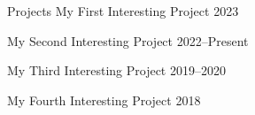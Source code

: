 \documentclass{src/cv}
\begin{document}
\setpersonalsummary{\lipsum[1][1-5]} %
\cvheader

\begin{skills} %
	\faitem{\faCode} \lipsum[4][1]
	\faitem{\faLinux} \lipsum[4][2]
	\faitem{\faDatabase} \lipsum[4][3]
	\faitem{\faChartBar} \lipsum[4][4]
	\columnbreak
	\faitem{\faGit*} \lipsum[4][5]
	\faitem{\faProjectDiagram} \lipsum[4][6]
	\faitem{\faCogs} \lipsum[4][7]
	\faitem{\faCloud} \lipsum[4][8]
\end{skills}


\begin{career}
    { %
    \begin{careersection}{Projects}
        \careeritem
	{My First Interesting Project} %
        {2023} %
        {} %
        { %
        \begin{careeritemdetails}
	\item \lipsum[5][1-2] 
	\item \lipsum[5][3-4]
	\item \lipsum[5][4-5]
        \end{careeritemdetails}
        }
        \careeritem
	{My Second Interesting Project} %
        {2022--Present} %
        {} %
        { %
        \begin{careeritemdetails}
	\item \lipsum[6][1-2] 
	\item \lipsum[6][3-4]
	\item \lipsum[6][5-6]
        \end{careeritemdetails}
        }
        \careeritem
	{My Third Interesting Project} %
        {2019--2020} %
        {} %
        { %
        \begin{careeritemdetails}
	\item \lipsum[7][1-2] 
	\item \lipsum[7][3-4]
	\item \lipsum[7][5-6]
        \end{careeritemdetails}
        }
        \careeritem
	{My Fourth Interesting Project} %
        {2018} %
        {} %
        { %
        \begin{careeritemdetails}

\end{careeritemdetails}}
\end{careersection}}
\end{career}
\end{document}
